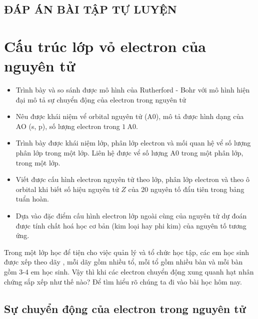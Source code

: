 \newpage
\subsection{ĐÁP ÁN BÀI TẬP TỰ LUYỆN}



\newpage
\section{Cấu trúc lớp vỏ electron của nguyên tử}
\begin{mtbh}
	\begin{itemize}
		\item Trình bày và so sánh được mô hình của Rutherford - Bohr với mô hình hiện đại mô tả sự chuyển động của electron trong nguyên tử
		\item Nêu được khái niệm vể orbital nguyên tử (A0), mô tả được hình dạng của AO (s, p), số lượng electron trong $1 \mathrm{~A} 0$.
		\item Trình bày được khái niệm lớp, phân lớp electron và mối quan hệ vể số lượng phân lớp trong một lớp. Liên hệ được vể số lượng A0 trong một phân lớp, trong một lớp.
		\item Viết được cấu hình electron nguyên tử theo lớp, phân lớp electron và theo ô orbital khi biết số hiệu nguyên tử $Z$ của 20 nguyên tố đẩu tiên trong bảng tuẩn hoàn.
		\item Dựa vào đặc điểm cấu hình electron lớp ngoài cùng của nguyên tử dự đoán được tính chất hoá học cơ bản (kim loại hay phi kim) của nguyên tố tương ứng. 
	\end{itemize}
\end{mtbh}

\begin{kd}
	Trong một lớp học để tiện cho việc quản lý và tổ chức học tập, các em học sinh được xếp theo dãy , mỗi dãy gồm nhiều tổ, mỗi tổ gồm nhiều bàn và mỗi bàn gồm 3-4 em học sinh. Vậy thì khi các electron chuyển động xung quanh hạt nhân chứng sắp xếp như thế nào? Để tìm hiểu rõ chúng ta đi vào bài học hôm nay.
\end{kd}
\newpage
\subsection{Sự chuyển động của electron trong nguyên tử}
